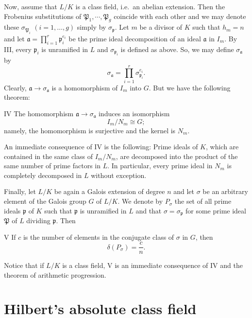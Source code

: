 Now, assume that $L/K$ is a class field, i.e.\ an abelian extension. Then
the Frobenius substitutions of $\mathfrak{P}_{1},\cdots,\mathfrak{P}_{g}$
coincide with each other and we may denote these
$\sigma_{\mathfrak{P}_{i}}$ $(i=1,\ldots,g)$ simply by
$\sigma_{\mathfrak{p}}$. Let $m$ be a divisor of $K$ such that $h_{m}=n$
and let $\mathfrak{a}=\prod_{i=1}^{r}\mathfrak{p}_{i}^{e_{i}}$ be the
prime ideal decomposition of an ideal $\mathfrak{a}$ in $I_{m}$. By III,
every $\mathfrak{p}_{i}$ is unramified in $L$ and $\sigma_{\mathfrak{p}_{i}}$
is defined as above. So, we may define $\sigma_{\mathfrak{a}}$ by
\[
\sigma_{\mathfrak{a}}=\prod_{i=1}^{r}\sigma_{\mathfrak{p}_{i}}^{e_{i}}.
\]
Clearly, $\mathfrak{a}\longrightarrow\sigma_{\mathfrak{a}}$ is a
homomorphism of $I_{m}$ into $G$. But we have the following theorem:

\begin{namedstmt}{IV}
The homomorphism $\mathfrak{a}\longrightarrow\sigma_{\mathfrak{a}}$
induces an isomorphism
\[
I_{m}/N_{m}\cong G;
\]
namely, the homomorphism is surjective and the kernel is $N_{m}$.
\end{namedstmt}

An immediate consequence of IV is the following: Prime ideals of $K$,
which are contained in the same class of $I_{m}/N_{m}$, are decomposed
into the product of the same number of prime factors in $L$. In
particular, every prime ideal in $N_{m}$ is completely decomposed in $L$
without exception.

Finally, let $L/K$ be again a Galois extension of degree $n$ and let
$\sigma$ be an arbitrary element of the Galois group $G$ of $L/K$. We
denote by $P_{\sigma}$ the set of all prime ideals $\mathfrak{p}$ of $K$
such that $\mathfrak{p}$ is unramified in $L$ and that
$\sigma=\sigma_{\mathfrak{p}}$ for some prime ideal $\mathfrak{P}$ of $L$
dividing $\mathfrak{p}$. Then

\begin{namedstmt}{V}
If $c$ is the number of elements in the conjugate class of $\sigma$ in
$G$, then
\[
\delta(P_{\sigma})=\frac{c}{n}.
\]
\end{namedstmt}

Notice that if $L/K$ is a class field, V is an immediate consequence of
IV and the theorem of arithmetic progression.

\section{Hilbert's absolute class field}

